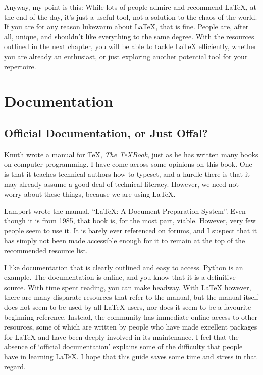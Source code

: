 \documentclass[11pt, oneside]{memoir}
\begin{document}
Anyway, my point is this: While lots of people admire and recommend LaTeX, at the end of the day, it's just a useful tool, not a solution to the chaos of the world. If you are for any reason lukewarm about LaTeX, that is fine. People are, after all, unique, and shouldn't like everything to the same degree. With the resources outlined in the next chapter, you will be able to tackle LaTeX efficiently, whether you are already an enthusiast, or just exploring another potential tool for your repertoire.

\chapter{Documentation}
\section{Official Documentation, or Just Offal?}

Knuth wrote a manual for TeX, \emph{The TeXBook}, just as he has written many books on computer programming. I have come across some opinions on this book. One is that it teaches technical authors how to typeset, and a hurdle there is that it may already assume a good deal of technical literacy. However, we need not worry about these things, because we are using LaTeX.

Lamport wrote the manual, ``LaTeX: A Document Preparation System''. Even though it is from 1985, that book is, for the most part, viable. However, very few people seem to use it. It is barely ever referenced on forums, and I suspect that it has simply not been made accessible enough for it to remain at the top of the recommended resource list. 

I like documentation that is clearly outlined and easy to access. Python is an example. The documentation is online, and you know that it is a definitive source. With time spent reading, you can make headway. With LaTeX however, there are many disparate resources that refer to the manual, but the manual itself does not seem to be used by all LaTeX users, nor does it seem to be a favourite beginning reference. Instead, the community has immediate online access to other resources, some of which are written by people who have made excellent packages for LaTeX and have been deeply involved in its maintenance. I feel that the absence of `official documentation' explains some of the difficulty that people have in learning LaTeX. I hope that this guide saves some time and stress in that regard.
\end{document}
